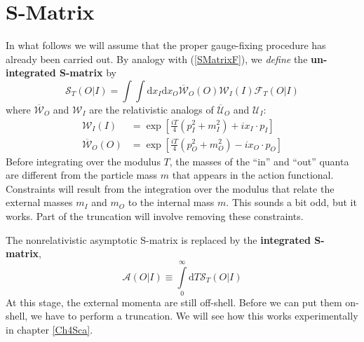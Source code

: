 \section{S-Matrix}
In what follows we will assume that the proper gauge-fixing procedure has already been carried out. By analogy with (\ref{SMatrixF}), we \textit{define} the \textbf{un-integrated S-matrix} by
\begin{equation}
	\mathcal{S}_{T}(O|I) = \int \int \mathrm{d}x_{I} \mathrm{d}x_{O} \overline{\mathcal{W}}_{O}(O) \mathcal{W}_{I}(I) \mathcal{F}_{T}(O|I)
\end{equation}
where $\overline{\mathcal{W}}_{O}$ and $\mathcal{W}_{I}$ are the relativistic analogs of $\overline{\mathcal{U}}_{O}$ and $\mathcal{U}_{I}$:
\begin{align}
	\mathcal{W}_{I}(I) &= \exp{\left[ \frac{i T}{4} \left( p_{I}^{2} + m_{I}^{2} \right) + i x_{I} \cdot p_{I} \right]} \\
	\overline{\mathcal{W}}_{O}(O) &= \exp{\left[\frac{i T}{4} \left( p_{O}^{2} + m_{O}^{2} \right) -i x_{O} \cdot p_{O} \right]}
\end{align}
Before integrating over the modulus $T$, the masses of the ``in'' and ``out'' quanta are different from the particle mass $m$ that appears in the action functional. Constraints will result from the integration over the modulus that relate the external masses $m_{I}$ and $m_{O}$ to the internal mass $m$. This sounds a bit odd, but it works. Part of the truncation will involve removing these constraints.

The nonrelativistic asymptotic S-matrix is replaced by the \textbf{integrated S-matrix},
\begin{equation}
	\mathcal{A}(O|I) \equiv \int\limits_{0}^{\infty} \mathrm{d}T \mathcal{S}_{T}(O|I)
\end{equation}
At this stage, the external momenta are still off-shell. Before we can put them on-shell, we have to perform a truncation. We will see how this works experimentally in chapter \ref{Ch4Sca}.
